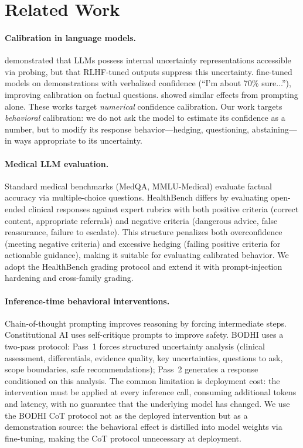 \documentclass{article}
\newcommand{\bodhi}{BODHI}
\begin{document}
\section{Related Work}
\label{sec:related}

\paragraph{Calibration in language models.} \citet{kadavath2022language} demonstrated that LLMs possess internal uncertainty representations accessible via probing, but that RLHF-tuned outputs suppress this uncertainty. \citet{lin2022teaching} fine-tuned models on demonstrations with verbalized confidence (``I'm about 70\% sure...''), improving calibration on factual questions. \citet{tian2023just} showed similar effects from prompting alone. These works target \emph{numerical} confidence calibration. Our work targets \emph{behavioral} calibration: we do not ask the model to estimate its confidence as a number, but to modify its response behavior---hedging, questioning, abstaining---in ways appropriate to its uncertainty.

\paragraph{Medical LLM evaluation.} Standard medical benchmarks (MedQA, MMLU-Medical) evaluate factual accuracy via multiple-choice questions. HealthBench \citep{healthbench2025} differs by evaluating open-ended clinical responses against expert rubrics with both positive criteria (correct content, appropriate referrals) and negative criteria (dangerous advice, false reassurance, failure to escalate). This structure penalizes both overconfidence (meeting negative criteria) and excessive hedging (failing positive criteria for actionable guidance), making it suitable for evaluating calibrated behavior. We adopt the HealthBench grading protocol and extend it with prompt-injection hardening and cross-family grading.

\paragraph{Inference-time behavioral interventions.} Chain-of-thought prompting \citep{wei2022chain} improves reasoning by forcing intermediate steps. Constitutional AI \citep{bai2022constitutional} uses self-critique prompts to improve safety. \bodhi{} \citep{bodhi2026} uses a two-pass protocol: Pass~1 forces structured uncertainty analysis (clinical assessment, differentials, evidence quality, key uncertainties, questions to ask, scope boundaries, safe recommendations); Pass~2 generates a response conditioned on this analysis. The common limitation is deployment cost: the intervention must be applied at every inference call, consuming additional tokens and latency, with no guarantee that the underlying model has changed. We use the \bodhi{} CoT protocol not as the deployed intervention but as a demonstration source: the behavioral effect is distilled into model weights via fine-tuning, making the CoT protocol unnecessary at deployment.
\end{document}
